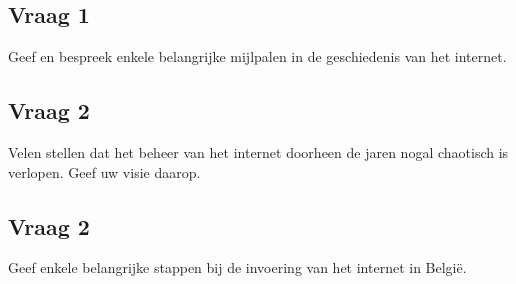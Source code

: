 \documentclass[../main.tex]{subfiles}
\begin{document}
\subsection{Vraag 1}
\begin{question}
	Geef en bespreek enkele belangrijke mijlpalen in de geschiedenis van het internet.
\end{question}

\begin{solution}
	
\end{solution}


\subsection{Vraag 2}
\begin{question}
	Velen stellen dat het beheer van het internet doorheen de jaren nogal chaotisch is
	verlopen. Geef uw visie daarop.
\end{question}

\begin{solution}
	
\end{solution}



\subsection{Vraag 2}
\begin{question}
	Geef enkele belangrijke stappen bij de invoering van het internet in België.
\end{question}

\begin{solution}
	
\end{solution}
\end{document}
